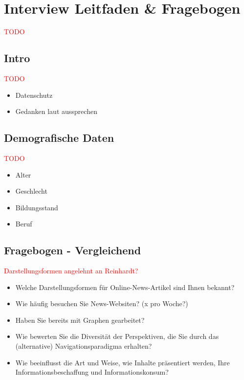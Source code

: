 \section{Interview Leitfaden \& Fragebogen}
\textcolor{red}{TODO}

\subsection{Intro}
\textcolor{red}{TODO}
\begin{itemize}
    \item Datenschutz
    \item Gedanken laut aussprechen
\end{itemize}

\subsection{Demografische Daten}
\textcolor{red}{TODO}
\begin{itemize}
    \item Alter
    \item Geschlecht
    \item Bildungsstand
    \item Beruf
\end{itemize}

\subsection{Fragebogen - Vergleichend}
\textcolor{red}{Darstellungsformen angelehnt an Reinhardt?}
\begin{itemize}
    \item Welche Darstellungsformen für Online-News-Artikel sind Ihnen bekannt?
    \item Wie häufig besuchen Sie News-Websiten? (x pro Woche?)
    \item Haben Sie bereits mit Graphen gearbeitet?
    \item Wie bewerten Sie die Diversität der Perspektiven, die Sie durch das (alternative) Navigationsparadigma erhalten?
    \item Wie beeinflusst die Art und Weise, wie Inhalte präsentiert werden, Ihre Informationsbeschaffung und Informationskonsum?
\end{itemize}
